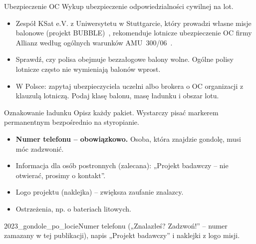 \clearpage
\begin{sekcja}{Ubezpieczenie OC}
Wykup ubezpieczenie odpowiedzialności cywilnej na lot.
\begin{itemize}
  \item Zespół KSat e.V. z Uniwersytetu w Stuttgarcie, który prowadzi własne misje balonowe (projekt BUBBLE)~\cite{ksat}, rekomenduje lotnicze ubezpieczenie OC firmy Allianz według ogólnych warunków AMU~300/06~\cite{amu}.
  \item Sprawdź, czy polisa obejmuje bezzałogowe balony wolne. Ogólne polisy lotnicze często nie wymieniają balonów wprost.
  \item W Polsce: zapytaj ubezpieczyciela uczelni albo brokera o OC organizacji z klauzulą lotniczą. Podaj klasę balonu, masę ładunku i obszar lotu.
\end{itemize}
\end{sekcja}

\begin{sekcja}{Oznakowanie ładunku}\label{sec:oznakowanie}
Opisz każdy pakiet. Wystarczy pisać markerem permanentnym bezpośrednio na styropianie.
\begin{itemize}
  \item \textbf{Numer telefonu -- obowiązkowo.} Osoba, która znajdzie gondolę, musi móc zadzwonić.
  \item Informacja dla osób postronnych (zalecana): „Projekt badawczy -- nie otwierać, prosimy o kontakt”.
  \item Logo projektu (naklejka) -- zwiększa zaufanie znalazcy.
  \item Ostrzeżenia, np. o bateriach litowych.
\end{itemize}

{2023_gondole_po_locie}{Numer telefonu („Znalazłeś? Zadzwoń!” -- numer zamazany w tej publikacji), napis „Projekt badawczy” i naklejki z logo misji.}
\end{sekcja}
